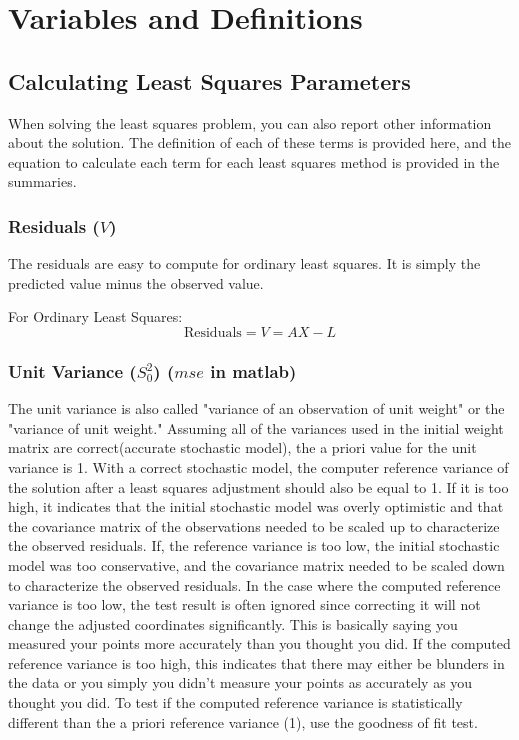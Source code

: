 \section{Variables and Definitions}

\subsection{Calculating Least Squares Parameters}
When solving the least squares problem, you can also report other information about the solution.  The definition of each of these terms is provided here, and the equation to calculate each term for each least squares method is provided in the summaries.

\subsubsection*{Residuals ($V$)}
The residuals are easy to compute for ordinary least squares.  It is simply the predicted value minus the observed value.

For Ordinary Least Squares:
\[
\text{Residuals} = V = AX - L
\]
\subsubsection*{Unit Variance ($S_0^2$) ($mse$ in matlab)}
The unit variance is also called "variance of an observation of unit weight" or the "variance of unit weight."  Assuming all of the variances used in the initial weight matrix are correct(accurate stochastic model), the a priori value for the unit variance is 1.  With a correct stochastic model, the computer reference variance of the solution after a least squares adjustment should also be equal to 1.  If it is too high, it indicates that the initial stochastic model was overly optimistic and that the covariance matrix of the observations needed to be scaled up to characterize the observed residuals.  If, the reference variance is too low, the initial stochastic model was too conservative, and the covariance matrix needed to be scaled down to characterize the observed residuals.  In the case where the computed reference variance is too low, the test result is often ignored since correcting it will not change the adjusted coordinates significantly.  This is basically saying you measured your points more accurately than you thought you did.  If the computed reference variance is too high, this indicates that there may either be blunders in the data or you simply you didn't measure your points as accurately as you thought you did.  To test if the computed reference variance is statistically different than the a priori reference variance (1), use the goodness of fit test.

